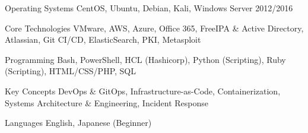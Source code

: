 


\begin{cvskills}


\cvskill
{Operating Systems} %
{CentOS, Ubuntu,  Debian,  Kali, Windows Server 2012/2016} %


\cvskill
{Core Technologies} %
{VMware, AWS, Azure, Office 365, FreeIPA \& Active Directory, Atlassian, Git CI/CD, ElasticSearch, PKI,  Metasploit} %


\cvskill
{Programming} %
{Bash, PowerShell,  HCL (Hashicorp), Python (Scripting), Ruby (Scripting), HTML/CSS/PHP, SQL} %


\cvskill
{Key Concepts} %
{DevOps \& GitOps, Infrastructure-as-Code, Containerization, Systems Architecture \& Engineering, Incident Response} %


\cvskill
{Languages} %
{English, Japanese (Beginner)} %


\end{cvskills}